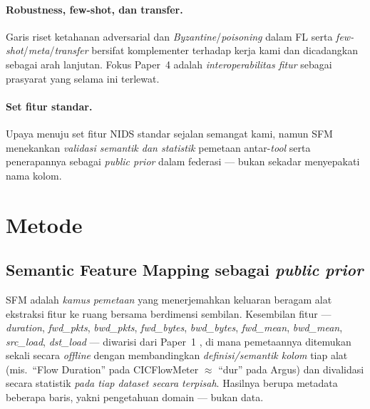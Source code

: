 \documentclass[11pt,a4paper]{article}
\begin{document}
\paragraph{Robustness, few-shot, dan transfer.} Garis riset ketahanan adversarial
dan \emph{Byzantine}/\emph{poisoning} dalam FL \cite{frobust,fbackdoor,fdelve}
serta \emph{few-shot}/\emph{meta}/\emph{transfer} \cite{ffewshot,ffecograph,ftransfer}
bersifat komplementer terhadap kerja kami dan dicadangkan sebagai arah lanjutan.
Fokus Paper~4 adalah \emph{interoperabilitas fitur} sebagai prasyarat yang selama
ini terlewat.

\paragraph{Set fitur standar.} Upaya menuju set fitur NIDS standar
\cite{sarhan,sarhannf} sejalan semangat kami, namun SFM menekankan \emph{validasi
semantik dan statistik} pemetaan antar-\emph{tool} serta penerapannya sebagai
\emph{public prior} dalam federasi --- bukan sekadar menyepakati nama kolom.

\FloatBarrier
\section{Metode}
\label{sec:method}

\subsection{Semantic Feature Mapping sebagai \emph{public prior}}
\label{sec:sfm}

SFM adalah \emph{kamus pemetaan} yang menerjemahkan keluaran beragam alat
ekstraksi fitur ke ruang bersama berdimensi sembilan. Kesembilan fitur ---
\emph{duration}, \emph{fwd\_pkts}, \emph{bwd\_pkts}, \emph{fwd\_bytes},
\emph{bwd\_bytes}, \emph{fwd\_mean}, \emph{bwd\_mean}, \emph{src\_load},
\emph{dst\_load} --- diwarisi dari Paper~1 \cite{sfm}, di mana pemetaannya
ditemukan sekali secara \emph{offline} dengan membandingkan \emph{definisi/semantik
kolom} tiap alat (mis.\ ``Flow Duration'' pada CICFlowMeter $\approx$ ``dur'' pada
Argus) dan divalidasi secara statistik \emph{pada tiap dataset secara terpisah}.
Hasilnya berupa metadata beberapa baris, yakni pengetahuan domain --- bukan data.
\end{document}
